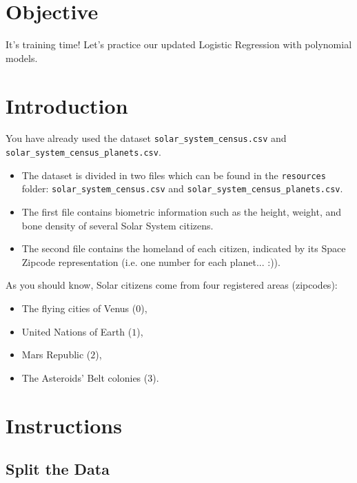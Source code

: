 \documentclass{42-en}
\begin{document}
\section*{Objective}
It's training time!
Let's practice our updated Logistic Regression with polynomial models.
\section*{Introduction}
You have already used the dataset \texttt{solar\_system\_census.csv} and \texttt{solar\_system\_census\_planets.csv}.
\begin{itemize}
	\item The dataset is divided in two files which can be found in the \texttt{resources} folder: \texttt{solar\_system\_census.csv} and \texttt{solar\_system\_census\_planets.csv}.
	\item The first file contains biometric information such as the height, weight, and bone density of several Solar System citizens.
	\item The second file contains the homeland of each citizen, indicated by its Space Zipcode representation (i.e. one number for each planet... :)).  
\end{itemize}

As you should know, Solar citizens come from four registered areas (zipcodes): 

\begin{itemize}
	\item The flying cities of Venus ($0$), 
	\item United Nations of Earth ($1$), 
	\item Mars Republic ($2$), 
	\item The Asteroids' Belt colonies ($3$).
\end{itemize}

\section*{Instructions}
\subsection*{Split the Data}
\end{document}

